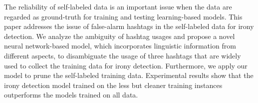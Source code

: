 The reliability of self-labeled data is an important issue when the data are regarded as ground-truth for training and testing learning-based models. This paper addresses the issue of false-alarm hashtags in the self-labeled data for irony detection. We analyze the ambiguity of hashtag usages and propose a novel neural network-based model, which incorporates linguistic information from different aspects, to disambiguate the usage of three hashtags that are widely used to collect the training data for irony detection. Furthermore, we apply our model to prune the self-labeled training data. Experimental results show that the irony detection model trained on the less but cleaner training instances outperforms the models trained on all data.
